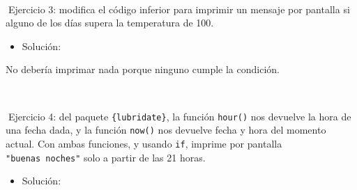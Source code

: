\documentclass[11pt,]{book}
\newenvironment{Shaded}{\begin{snugshade}}{\end{snugshade}}
\newcommand{\CommentTok}[1]{\textcolor[rgb]{0.37,0.37,0.37}{\textit{#1}}}
\newcommand{\ControlFlowTok}[1]{\textcolor[rgb]{0.27,0.27,0.27}{\textbf{#1}}}
\newcommand{\DecValTok}[1]{\textcolor[rgb]{0.06,0.06,0.06}{#1}}
\newcommand{\KeywordTok}[1]{\textcolor[rgb]{0.27,0.27,0.27}{\textbf{#1}}}
\newcommand{\NormalTok}[1]{#1}
\newcommand{\OperatorTok}[1]{\textcolor[rgb]{0.43,0.43,0.43}{\textbf{#1}}}
\newcommand{\StringTok}[1]{\textcolor[rgb]{0.5,0.5,0.5}{#1}}
\providecommand{\tightlist}{%
  \setlength{\itemsep}{0pt}\setlength{\parskip}{0pt}}
\begin{document}
~

📝Ejercicio 3: modifica el código inferior para imprimir un mensaje por pantalla si alguno de los días supera la temperatura de 100.

\begin{Shaded}
\end{Shaded}

\begin{itemize}
\tightlist
\item
  Solución:
\end{itemize}

\begin{Shaded}
\end{Shaded}

No debería imprimar nada porque ninguno cumple la condición.

~

📝Ejercicio 4: del paquete \texttt{\{lubridate\}}, la función \texttt{hour()} nos devuelve la hora de una fecha dada, y la función \texttt{now()} nos devuelve fecha y hora del momento actual. Con ambas funciones, y usando \texttt{if}, imprime por pantalla \texttt{"buenas\ noches"} solo a partir de las 21 horas.

\begin{itemize}
\tightlist
\item
  Solución:
\end{itemize}
\end{document}
